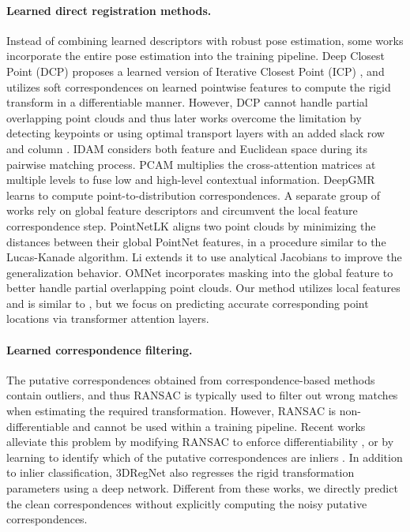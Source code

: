 \documentclass[10pt,twocolumn,letterpaper]{article}
\begin{document}
\paragraph{Learned direct registration methods.}
Instead of combining learned descriptors with robust pose estimation, some works incorporate the entire pose estimation into the training pipeline.
Deep Closest Point (DCP) \cite{wang2019dcp} proposes a learned version of Iterative Closest Point (ICP) \cite{besl1992icp,chen-medioni1991icp}, and utilizes soft correspondences on learned pointwise features to compute the rigid transform in a differentiable manner. However, DCP cannot handle partial overlapping point clouds and thus later works overcome the limitation by detecting keypoints \cite{wang2019prnet} or using optimal transport layers with an added slack row and column \cite{yew2020rpmnet,fischer2021stickypillars}. IDAM \cite{li2020idam} considers both feature and Euclidean space during its pairwise matching process.
PCAM \cite{cao2021pcam} multiplies the cross-attention matrices at multiple levels to fuse low and high-level contextual information.
DeepGMR \cite{yuan2020deepgmr} learns to compute point-to-distribution correspondences.
A separate group of works \cite{aoki2019pointnetlk,li2021pointnetlk2,xu2021omnet,huang2020featuremetric,sarode2019pcrnet} rely on global feature descriptors and circumvent the local feature correspondence step. PointNetLK \cite{aoki2019pointnetlk} aligns two point clouds by minimizing the distances between their global PointNet \cite{qi2017pointnet} features, in a procedure similar to the Lucas-Kanade \cite{baker2004lucas} algorithm.
Li \etal \cite{li2021pointnetlk2} extends it to use analytical Jacobians to improve the generalization behavior. OMNet \cite{xu2021omnet} incorporates masking into the global feature to better handle partial overlapping point clouds.
Our method utilizes local features and is similar to \eg \cite{wang2019dcp,wang2019prnet}, but we focus on predicting accurate corresponding point locations via transformer attention layers.

\vspace{-4.2mm}
\paragraph{Learned correspondence filtering.}
The putative correspondences obtained from correspondence-based methods contain outliers, and thus RANSAC is typically used to filter out wrong matches when estimating the required transformation. However, RANSAC is non-differentiable and cannot be used within a training pipeline. Recent works alleviate this problem by modifying RANSAC to enforce differentiability \cite{brachmann2017dsac}, or by learning to identify which of the putative correspondences are inliers \cite{yi2018learning,choy2020dgr,lee2021houghvote,gojcic2020multiview}. In addition to inlier classification, 3DRegNet \cite{pais20203dregnet} also regresses the rigid transformation parameters using a deep network.
Different from these works, we directly predict the clean correspondences without explicitly computing the noisy putative correspondences. 
\end{document}
